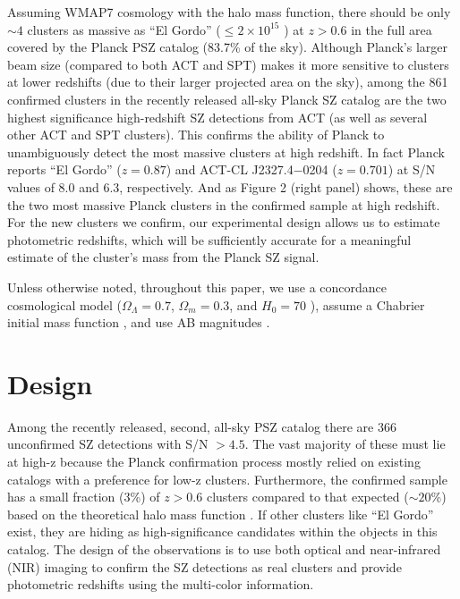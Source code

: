 \documentclass[apj, revtex4]{emulateapj}
\begin{document}
Assuming WMAP7 cosmology \citep{Komatsu2011} with the \cite{Tinker2008} halo mass function, there should be only $\sim4$ clusters as massive as “El Gordo” ($\leq 2 \times 10^{15}$ \Msol) at $z > 0.6$ in the full area covered by the Planck PSZ catalog (83.7\% of the sky). Although Planck’s larger beam size (compared to both ACT and SPT) makes it more sensitive to clusters at lower redshifts (due to their larger projected area on the sky), among the 861 confirmed clusters in the recently released all-sky Planck SZ catalog are the two highest significance high-redshift SZ detections from ACT (as well as several other ACT and SPT clusters). This confirms the ability of Planck to unambiguously detect the most massive clusters at high redshift. In fact Planck reports ``El Gordo'' ($z = 0.87$) and ACT-CL J2327.4−0204 ($z = 0.701$) at S/N values of 8.0 and 6.3, respectively. And as Figure 2 (right panel) shows, these are the two most massive Planck clusters in the confirmed sample at high redshift. For the new clusters we confirm, our experimental design allows us to estimate photometric redshifts, which will be sufficiently accurate for a meaningful estimate of the cluster’s mass from the Planck SZ signal.

Unless otherwise noted, throughout this paper, we use a concordance cosmological model ($\Omega_\Lambda = 0.7$, $\Omega_m = 0.3$, and $H_0= 70$ \kms \mpc), assume a Chabrier initial mass function \citep{Chabrier2003}, and use AB magnitudes \citep{Oke1974}.

\section{Design}\label{sec:design}
Among the recently released, second, all-sky PSZ catalog \citep{PlanckCollaboration2015} there are 366 unconfirmed SZ detections with S/N $> 4.5$. The vast majority of these must lie at high-z because the Planck confirmation process mostly relied on existing catalogs with a preference for low-z clusters. Furthermore, the confirmed sample has a small fraction (3\%) of $z > 0.6$ clusters compared to that expected ($\sim20$\%) based on the theoretical halo mass function \citep{Jenkins2001, Tinker2008}. If other clusters like ``El Gordo'' exist, they are hiding as high-significance candidates within the objects in this catalog. The design of the observations is to use both optical and near-infrared (NIR) imaging to confirm the SZ detections as real clusters and provide photometric redshifts using the multi-color information.
 
\end{document}

